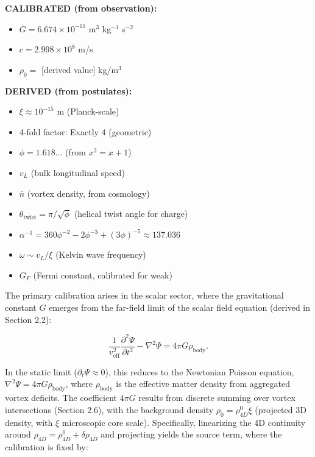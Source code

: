 \begin{tcolorbox}[title=Parameter Values]
\textbf{CALIBRATED (from observation):}
\begin{itemize}
\item $G = 6.674 \times 10^{-11}$ m$^3$ kg$^{-1}$ s$^{-2}$
\item $c = 2.998 \times 10^8$ m/s
\item $\rho_0 = $ [derived value] kg/m$^3$
\end{itemize}

\textbf{DERIVED (from postulates):}
\begin{itemize}
\item $\xi \approx 10^{-15}$ m (Planck-scale)
\item 4-fold factor: Exactly 4 (geometric)
\item $\phi = 1.618\dots$ (from $x^2 = x + 1$)
\item $v_L$ (bulk longitudinal speed)
\item $\bar{n}$ (vortex density, from cosmology)
\item $\theta_{\text{twist}} = \pi / \sqrt{\phi}$ (helical twist angle for charge)
\item $\alpha^{-1} = 360 \phi^{-2} - 2 \phi^{-3} + (3 \phi)^{-5} \approx 137.036$
\item $\omega \sim v_L / \xi$ (Kelvin wave frequency)
\item $G_F$ (Fermi constant, calibrated for weak)
\end{itemize}
\end{tcolorbox}

The primary calibration arises in the scalar sector, where the gravitational constant $G$ emerges from the far-field limit of the scalar field equation (derived in Section 2.2):

\[
\frac{1}{v_{\text{eff}}^2} \frac{\partial^2 \Psi}{\partial t^2} - \nabla^2 \Psi = 4\pi G \rho_{\text{body}}.
\]

In the static limit ($\partial_t \Psi \approx 0$), this reduces to the Newtonian Poisson equation, $\nabla^2 \Psi = 4\pi G \rho_{\text{body}}$, where $\rho_{\text{body}}$ is the effective matter density from aggregated vortex deficits. The coefficient $4\pi G$ results from discrete summing over vortex intersections (Section 2.6), with the background density $\rho_0 = \rho_{4D}^0 \xi$ (projected 3D density, with $\xi$ microscopic core scale). Specifically, linearizing the 4D continuity around $\rho_{4D} = \rho_{4D}^0 + \delta \rho_{4D}$ and projecting yields the source term, where the calibration is fixed by:

